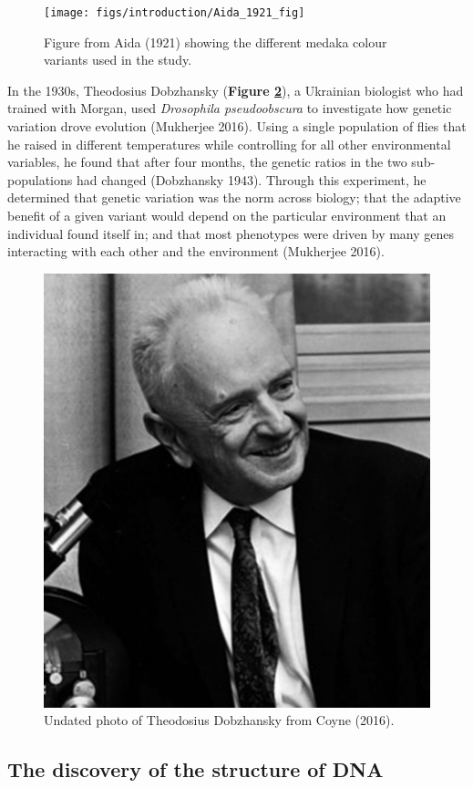 \documentclass[
]{book}
\begin{document}
\begin{figure}

{\centering \texttt{[image: figs/introduction/Aida\_1921\_fig]} 

}

\caption{Figure from Aida (1921) showing the different medaka colour variants used in the study.}\label{fig:aida-fig}
\end{figure}

In the 1930s, Theodosius Dobzhansky (\textbf{Figure \ref{fig:dobzhansky}}), a Ukrainian biologist who had trained with Morgan, used \emph{Drosophila pseudoobscura} to investigate how genetic variation drove evolution (Mukherjee 2016). Using a single population of flies that he raised in different temperatures while controlling for all other environmental variables, he found that after four months, the genetic ratios in the two sub-populations had changed (Dobzhansky 1943). Through this experiment, he determined that genetic variation was the norm across biology; that the adaptive benefit of a given variant would depend on the particular environment that an individual found itself in; and that most phenotypes were driven by many genes interacting with each other and the environment (Mukherjee 2016).



\begin{figure}

{\centering \includegraphics[width=0.5\linewidth]{figs/introduction/Dobzhansky} 

}

\caption{Undated photo of Theodosius Dobzhansky from Coyne (2016).}\label{fig:dobzhansky}
\end{figure}

\hypertarget{the-discovery-of-the-structure-of-dna}{%
\subsection{The discovery of the structure of DNA}\label{the-discovery-of-the-structure-of-dna}}
\end{document}
